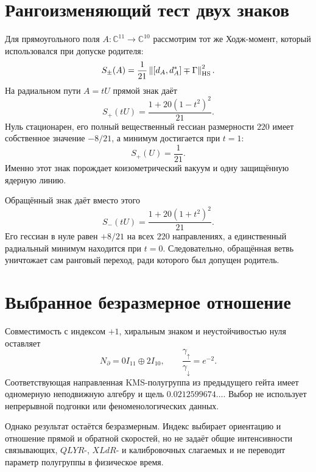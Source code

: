 \section{Рангоизменяющий тест двух знаков}

Для прямоугольного поля $A:\mathbb C^{11}\to\mathbb C^{10}$ рассмотрим
тот же Ходж-момент, который использовался при допуске родителя:
\begin{equation}
 S_{\pm}(A)=\frac1{21}
 \left\|[d_A,d_A^*]\mp\Gamma\right\|_{\rm HS}^2.
 \label{eq:v8-two-chiral-sign-actions}
\end{equation}
На радиальном пути $A=tU$ прямой знак даёт
\begin{equation}
 S_+(tU)=\frac{1+20(1-t^2)^2}{21}.
 \label{eq:v8-selected-radial-action}
\end{equation}
Нуль стационарен, его полный вещественный гессиан размерности $220$ имеет
собственное значение $-8/21$, а минимум достигается при $t=1$:
\begin{equation}
 S_+(U)=\frac1{21}.
\end{equation}
Именно этот знак порождает коизометрический вакуум и одну защищённую
ядерную линию.

Обращённый знак даёт вместо этого
\begin{equation}
 S_-(tU)=\frac{1+20(1+t^2)^2}{21}.
 \label{eq:v8-reversed-radial-action}
\end{equation}
Его гессиан в нуле равен $+8/21$ на всех $220$ направлениях, а единственный
радиальный минимум находится при $t=0$. Следовательно, обращённая ветвь
уничтожает сам ранговый переход, ради которого был допущен родитель.

\section{Выбранное безразмерное отношение}

Совместимость с индексом $+1$, хиральным знаком и неустойчивостью нуля
оставляет
\begin{equation}
 N_{\partial}=0I_{11}\oplus2I_{10},
 \qquad
 \frac{\gamma_\uparrow}{\gamma_\downarrow}=e^{-2}.
 \label{eq:v8-index-selected-rate-ratio}
\end{equation}
Соответствующая направленная KMS-полугруппа из предыдущего гейта имеет
одномерную неподвижную алгебру и щель
$0.0212599674\ldots$. Выбор не использует непрерывной подгонки или
феноменологических данных.

Однако результат остаётся безразмерным. Индекс выбирает ориентацию и
отношение прямой и обратной скоростей, но не задаёт общие интенсивности
связывающих, $QLYR$-, $XLdR$- и калибровочных слагаемых и не переводит параметр
полугруппы в физическое время.

